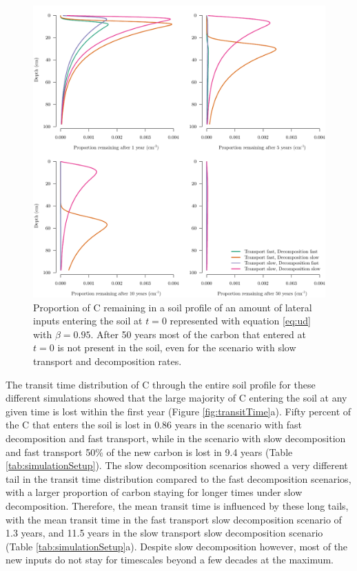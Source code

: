 \documentclass[11pt, oneside, a4paper]{article}   	%
\begin{document}
\begin{figure}[htbp]
   \centering
   \includegraphics[width=\textwidth]{Figures/Mt.pdf} %
   \caption{Proportion of C remaining in a soil profile of an amount of lateral inputs entering the soil at $t=0$ represented with equation \ref{eq:ud} with $\beta = 0.95$. After 50 years most of the carbon that entered at $t=0$ is not present in the soil, even for the scenario with slow transport and decomposition rates. }
   \label{fig:Mt}
\end{figure}

The transit time distribution of C through the entire soil profile for these different simulations showed that the large majority of C entering the soil at any given time is lost within the first year (Figure \ref{fig:transitTime}a). Fifty percent of the C that enters the soil is lost in 0.86 years in the scenario with fast decomposition and fast transport, while in the scenario with slow decomposition and fast transport 50\% of the new carbon is lost in 9.4 years (Table \ref{tab:simulationSetup}). The slow decomposition scenarios showed a very different tail in the transit time distribution compared to the fast decomposition scenarios, with a larger proportion of carbon staying for longer times under slow decomposition. Therefore, the mean transit time is influenced by these long tails, with the mean transit time in the fast transport slow decomposition scenario of 1.3 years, and 11.5 years in the slow transport slow decomposition scenario (Table \ref{tab:simulationSetup}a). Despite slow decomposition however, most of the new inputs do not stay for timescales beyond a few decades at the maximum. 
\end{document}
